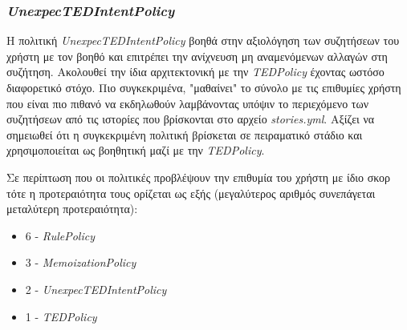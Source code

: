 \subsubsection{\emph{UnexpecTEDIntentPolicy}}
Η πολιτική \emph{UnexpecTEDIntentPolicy} βοηθά στην αξιολόγηση των συζητήσεων του χρήστη με τον βοηθό και επιτρέπει την ανίχνευση μη αναμενόμενων αλλαγών στη συζήτηση. Ακολουθεί την ίδια αρχιτεκτονική με την \emph{TEDPolicy} έχοντας ωστόσο διαφορετικό στόχο. Πιο συγκεκριμένα, "μαθαίνει" το σύνολο με τις επιθυμίες χρήστη που είναι πιο πιθανό να εκδηλωθούν λαμβάνοντας υπόψιν το περιεχόμενο των συζητήσεων από τις ιστορίες που βρίσκονται στο αρχείο \emph{stories.yml}. Αξίζει να σημειωθεί ότι η συγκεκριμένη πολιτική βρίσκεται σε πειραματικό στάδιο και χρησιμοποιείται ως βοηθητική μαζί με την \emph{TEDPolicy}.

Σε περίπτωση που οι πολιτικές προβλέψουν την επιθυμία του χρήστη με ίδιο σκορ τότε η προτεραιότητα τους ορίζεται ως εξής (μεγαλύτερος αριθμός συνεπάγεται μεταλύτερη προτεραιότητα):
\begin{itemize}
    \item 6 - \emph{RulePolicy}
    \item 3 - \emph{MemoizationPolicy}
    \item 2 - \emph{UnexpecTEDIntentPolicy}
    \item 1 - \emph{TEDPolicy}
\end{itemize}